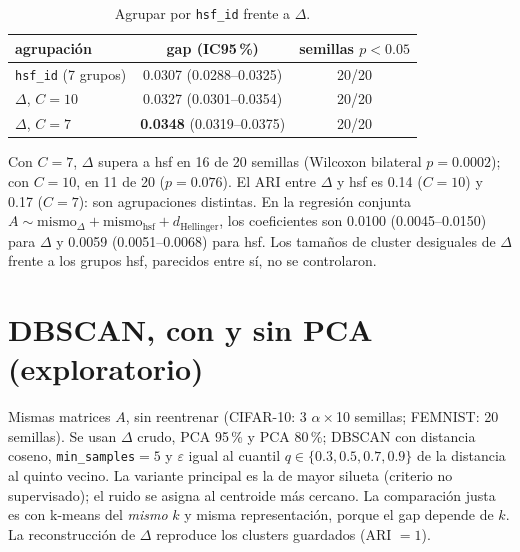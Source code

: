 \documentclass[11pt,a4paper]{article}
\begin{document}
\begin{table}[h]
\centering\small
\begin{tabular}{lcc}
\toprule
agrupación & gap (IC95\,\%) & semillas $p<0.05$\\
\midrule
\texttt{hsf\_id} (7 grupos) & 0.0307 (0.0288--0.0325) & 20/20\\
$\Delta$, $C=10$ & 0.0327 (0.0301--0.0354) & 20/20\\
$\Delta$, $C=7$ & \textbf{0.0348} (0.0319--0.0375) & 20/20\\
\bottomrule
\end{tabular}
\caption{Agrupar por \texttt{hsf\_id} frente a $\Delta$.}
\label{tab:hsf}
\end{table}

Con $C=7$, $\Delta$ supera a hsf en 16 de 20 semillas (Wilcoxon bilateral $p=0.0002$); con $C=10$, en 11 de 20 ($p=0.076$). El ARI entre $\Delta$ y hsf es 0.14 ($C=10$) y 0.17 ($C=7$): son agrupaciones distintas. En la regresión conjunta $A\sim\text{mismo}_\Delta+\text{mismo}_{\text{hsf}}+d_{\text{Hellinger}}$, los coeficientes son 0.0100 (0.0045--0.0150) para $\Delta$ y 0.0059 (0.0051--0.0068) para hsf. Los tamaños de cluster desiguales de $\Delta$ frente a los grupos hsf, parecidos entre sí, no se controlaron.

\section{DBSCAN, con y sin PCA (exploratorio)}
Mismas matrices $A$, sin reentrenar (CIFAR-10: 3 $\alpha\times$10 semillas; FEMNIST: 20 semillas). Se usan $\Delta$ crudo, PCA 95\,\% y PCA 80\,\%; DBSCAN con distancia coseno, \texttt{min\_samples}$=5$ y $\varepsilon$ igual al cuantil $q\in\{0.3,0.5,0.7,0.9\}$ de la distancia al quinto vecino. La variante principal es la de mayor silueta (criterio no supervisado); el ruido se asigna al centroide más cercano. La comparación justa es con k-means del \emph{mismo} $k$ y misma representación, porque el gap depende de $k$. La reconstrucción de $\Delta$ reproduce los clusters guardados (ARI $=1$).
\end{document}
